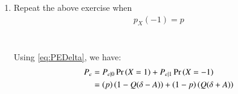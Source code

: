 \documentclass[journal,12pt,twocolumn]{IEEEtran}
\renewcommand\thesection{\arabic{section}}
\begin{document}
\begin{enumerate}[label=\thesection.\arabic*
,ref=\thesection.\theenumi]
	Similarly
	\begin{align}
		P_{e|1} &= \pr{\hat{X} = 1|X = -1} \\
		&= \frac{\pr{\hat{X} = 1, X = -1}}{\pr{X = -1}} \\
		&= \frac{\pr{Y > \delta, X = -1}}{\pr{X = -1}} \\
		&= \pr{-A + N > \delta} \\
		&= \pr{N > \delta + A} \\
		&= Q(\delta + A)
		\label{eq:PE1Delta}
	\end{align}
	
	We can write
	\begin{align}
		P_e = P_{e|0} \pr{X = 1} + P_{e|1} \pr{X = -1}
		\label{eq:PEDelta}
	\end{align}
	\begin{align}
		P_e = \frac{1}{2}\left( 1 - Q(\delta - A) + Q(\delta + A) \right)
	\end{align}
	
	To minimise this, we will find the value at $A$ when
	\begin{align}
		\frac{dP_e}{dA} = 0 
	\end{align}
	\begin{align}
		\frac{1}{2} \frac{d}{dA}\left( 1 - Q(\delta - A) + Q(\delta + A) \right) = 0
	\end{align}
	\begin{align}
		\frac{e^{-\frac{\left( \delta - A\right)^2}{2}}}{\sqrt{2\pi}} - \frac{e^{-\frac{\left( \delta + A\right)^2}{2}}}{\sqrt{2\pi}} = 0
	\end{align}
	\begin{align}
		e^{-\frac{\left( \delta - A\right)^2}{2}} = e^{-\frac{\left( \delta + A\right)^2}{2}}
	\end{align}
	\begin{align}
		\frac{\left( \delta - A\right)^2}{2} = \frac{\left( \delta + A\right)^2}{2}
	\end{align}
	\begin{align}
		\left( \delta - A\right)^2 = \left( \delta + A\right)^2
	\end{align}
	\begin{align}
		\delta = 0
		\label{eq:AValue}
	\end{align}
	

\item Repeat the above exercise when 
	\begin{align}
		p_{X}(-1) = p
	\end{align}
	\\
	\solution
	\\
	Using \eqref{eq:PEDelta}, we have:
	\begin{align}
		P_e &= P_{e|0} \Pr\left(X = 1\right) + P_{e|1} \Pr\left(X = -1\right) \\
		&= \left(p\right) \left(1 - Q(\delta-A)\right) + \left(1-p\right) \left(Q(\delta+A)\right)
	\end{align}


\end{enumerate}
\end{document}
